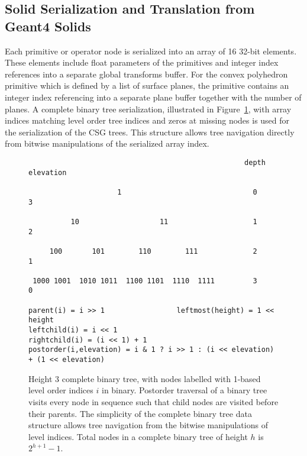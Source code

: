 \documentclass{webofc}
\begin{document}
\subsection{Solid Serialization and Translation from Geant4 Solids}
\label{translation}
%
Each primitive or operator node is serialized into an array of 16 32-bit elements. 
These elements include float parameters of the primitives and integer index references 
into a separate global transforms buffer. For the convex polyhedron primitive which is defined by a list of surface planes, 
the primitive contains an integer index referencing into a separate plane buffer together with the number of planes. 
A complete binary tree serialization, illustrated in Figure~\ref{tree},  with array indices matching level order tree indices
and zeros at missing nodes is used for the serialization of the CSG trees. This structure   
allows tree navigation directly from bitwise manipulations of the serialized array index. 
%
\begin{figure}[h]
\begin{verbatim}
                                                   depth     elevation

                     1                               0           3   

          10                   11                    1           2   

     100       101        110        111             2           1   
                    
 1000 1001  1010 1011  1100 1101  1110  1111         3           0   

parent(i) = i >> 1                 leftmost(height) = 1 << height 
leftchild(i) = i << 1               
rightchild(i) = (i << 1) + 1  
postorder(i,elevation) = i & 1 ? i >> 1 : (i << elevation) + (1 << elevation) 
\end{verbatim}

\caption{Height 3 complete binary tree, with nodes labelled with 1-based level order indices $i$ in binary. Postorder traversal of a binary tree
visits every node in sequence such that child nodes are visited before their parents. The simplicity of the complete binary tree data structure allows tree navigation 
from the bitwise manipulations of level indices. Total nodes in a complete binary tree of height $h$ is $2^{h+1} - 1$.  }
\label{tree}
\end{figure}
\end{document}
